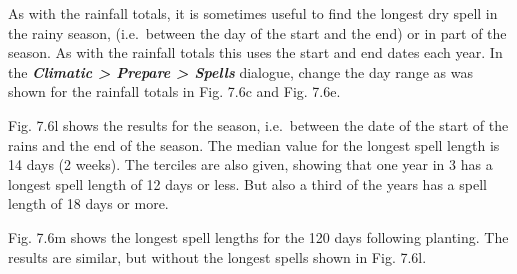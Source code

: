 \documentclass[
  letterpaper,
  DIV=11,
  numbers=noendperiod]{scrreprt}
\begin{document}
As with the rainfall totals, it is sometimes useful to find the longest
dry spell in the rainy season, (i.e.~between the day of the start and
the end) or in part of the season. As with the rainfall totals this uses
the start and end dates each year. In the \textbf{\emph{Climatic
\textgreater{} Prepare \textgreater{} Spells}} dialogue, change the day
range as was shown for the rainfall totals in Fig. 7.6c and Fig. 7.6e.

Fig. 7.6l shows the results for the season, i.e.~between the date of the
start of the rains and the end of the season. The median value for the
longest spell length is 14 days (2 weeks). The terciles are also given,
showing that one year in 3 has a longest spell length of 12 days or
less. But also a third of the years has a spell length of 18 days or
more.

Fig. 7.6m shows the longest spell lengths for the 120 days following
planting. The results are similar, but without the longest spells shown
in Fig. 7.6l.
\end{document}
